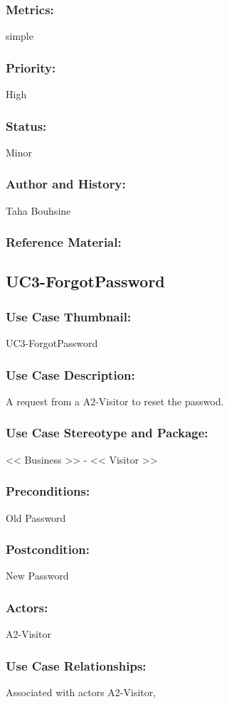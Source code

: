 \documentclass[11pt, openany]{report}
\begin{document}
\subsubsection{Metrics:}
simple
\subsubsection{Priority:}
High
\subsubsection{Status:}
Minor
\subsubsection{Author and History:}
Taha Bouhsine
\subsubsection{Reference Material:}

\subsection{UC3-ForgotPassword}
\label{UC3}
\subsubsection{Use Case Thumbnail:}
UC3-ForgotPassword
\subsubsection{Use Case Description:}
A request from a A2-Visitor to reset the passwod.
\subsubsection{Use Case Stereotype and Package:}
<< Business >> - << Visitor >>
\subsubsection{Preconditions:}
Old Password
\subsubsection{Postcondition:}
New Password
\subsubsection{Actors:}
A2-Visitor
\subsubsection{Use Case Relationships:}
Associated with actors A2-Visitor,
\end{document}
